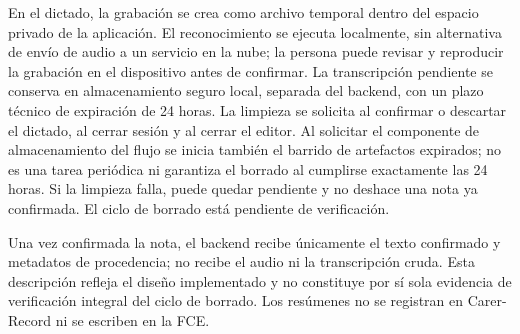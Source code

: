 En el dictado, la grabación se crea como archivo temporal dentro del espacio privado de la aplicación. El reconocimiento se ejecuta localmente, sin alternativa de envío de audio a un servicio en la nube; la persona puede revisar y reproducir la grabación en el dispositivo antes de confirmar. La transcripción pendiente se conserva en almacenamiento seguro local, separada del backend, con un plazo técnico de expiración de 24 horas. La limpieza se solicita al confirmar o descartar el dictado, al cerrar sesión y al cerrar el editor. Al solicitar el componente de almacenamiento del flujo se inicia también el barrido de artefactos expirados; no es una tarea periódica ni garantiza el borrado al cumplirse exactamente las 24 horas. Si la limpieza falla, puede quedar pendiente y no deshace una nota ya confirmada. El ciclo de borrado está pendiente de verificación.

Una vez confirmada la nota, el backend recibe únicamente el texto confirmado y metadatos de procedencia; no recibe el audio ni la transcripción cruda. Esta descripción refleja el diseño implementado y no constituye por sí sola evidencia de verificación integral del ciclo de borrado. Los resúmenes no se registran en Carer-Record ni se escriben en la FCE.
